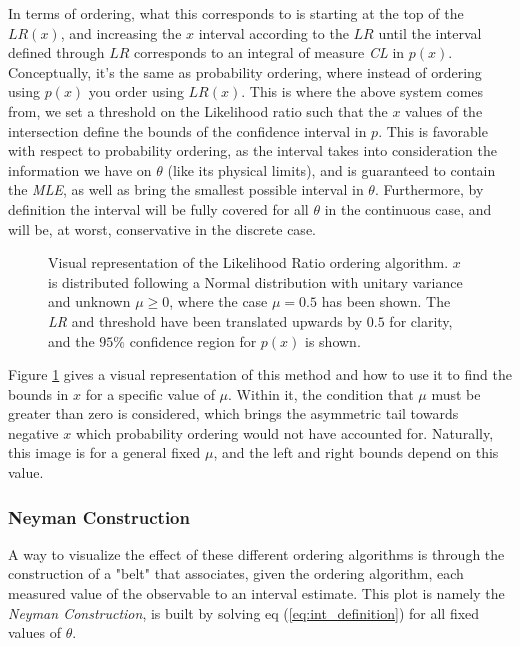 In terms of ordering, what this corresponds to is starting at the top of the $LR(x)$, and increasing the $x$ interval according to the $LR$ until the interval defined through $LR$ corresponds to an integral of measure \emph{CL} in $p(x)$. Conceptually, it's the same as probability ordering, where instead of ordering using $p(x)$ you order using $LR(x)$. This is where the above system comes from, we set a threshold on the Likelihood ratio such that the $x$ values of the intersection define the bounds of the confidence interval in $p$. This is favorable with respect to probability ordering, as the interval takes into consideration the information we have on $\theta$ (like its physical limits), and is guaranteed to contain the \emph{MLE}, as well as bring the smallest possible interval in $\theta$. Furthermore, by definition the interval will be fully covered for all $\theta$ in the continuous case, and will be, at worst, conservative in the discrete case.

\begin{figure}[H]
	\centering
	
	\caption{Visual representation of the Likelihood Ratio ordering algorithm. $x$ is distributed following a Normal distribution with unitary variance and unknown $\mu\geq 0$, where the case $\mu=0.5$ has been shown. The \emph{LR} and threshold have been translated upwards by $0.5$ for clarity, and the $95\%$ confidence region for $p(x)$ is shown.}
	\label{fig:lr_ordering}
\end{figure}

Figure \ref{fig:lr_ordering} gives a visual representation of this method and how to use it to find the bounds in $x$ for a specific value of $\mu$. Within it, the condition that $\mu$ must be greater than zero is considered, which brings the asymmetric tail towards negative $x$ which probability ordering would not have accounted for. Naturally, this image is for a general fixed $\mu$, and the left and right bounds depend on this value.

\subsubsection{Neyman Construction}
A way to visualize the effect of these different ordering algorithms is through the construction of a "belt" that associates, given the ordering algorithm, each measured value of the observable to an interval estimate. This plot is namely the \emph{Neyman Construction}, is built by solving eq (\ref{eq:int_definition}) for all fixed values of $\theta$. 

